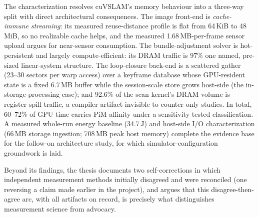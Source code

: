 The characterization resolves cuVSLAM's memory behaviour into a three-way
split with direct architectural consequences. The image front-end is
\emph{cache-immune streaming}: its measured reuse-distance profile is flat
from 64\,KiB to 48\,MiB, so no realizable cache helps, and the measured
1.68\,MB-per-frame sensor upload argues for near-sensor consumption. The
bundle-adjustment solver is hot-persistent and largely compute-efficient: its
DRAM traffic is 97\% one named, pre-sized linear-system structure. The
loop-closure back-end is a scattered gather (23--30 sectors per warp access)
over a keyframe database whose GPU-resident state is a fixed 6.7\,MB buffer
while the session-scale store grows host-side (the in-storage-processing
case); and 92.6\% of the scan kernel's DRAM volume is register-spill traffic,
a compiler artifact invisible to counter-only studies. In total, 60--72\% of
GPU time carries PiM affinity under a sensitivity-tested classification. A
measured whole-run energy baseline (34.7\,J) and host-side I/O
characterization (66\,MB storage ingestion; 708\,MB peak host memory) complete
the evidence base for the follow-on architecture study, for which
simulator-configuration groundwork is laid.

Beyond its findings, the thesis documents two self-corrections in which
independent measurement methods initially disagreed and were reconciled (one
reversing a claim made earlier in the project), and argues that this
disagree-then-agree arc, with all artifacts on record, is precisely what
distinguishes measurement science from advocacy.
